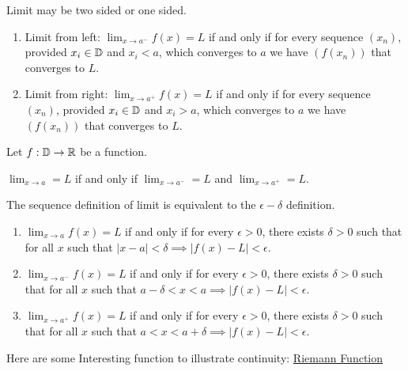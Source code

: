 \documentclass[../note.tex]{subfiles}
\begin{document}
\begin{definition}
	Limit may be two sided or one sided.
	\begin{enumerate}
	\item Limit from left: $\lim_{x \rightarrow a^-} f(x)=L$ if and only if for every sequence $(x_n)$, provided $x_i \in \mathbb{D}$ and $x_i<a$, which converges to $a$ we have $(f(x_n))$ that converges to $L$.
	\item Limit from right: $\lim_{x \rightarrow a^+} f(x)=L$ if and only if for every sequence $(x_n)$, provided $x_i \in \mathbb{D}$ and $x_i>a$, which converges to $a$ we have $(f(x_n))$ that converges to $L$.
	\end{enumerate}
\end{definition}

\begin{definition} 
\end{definition}

\begin{theorem}
	Let $f: \mathbb{D} \rightarrow \mathbb{R}$ be a function. 

	$\lim_{x \rightarrow a}=L$ if and only if $\lim_{x \rightarrow a^-}=L$ and $\lim_{x \rightarrow a^+}=L$.
\end{theorem}

\begin{theorem}
	The sequence definition of limit is equivalent to the $\epsilon-\delta$ definition.
	\begin{enumerate}
	\item $\lim_{x \rightarrow a} f(x)=L$ if and only if for every $\epsilon > 0$, there exists $\delta > 0$ such that for all $x$ such that $|x-a|<\delta \implies |f(x)-L|<\epsilon$.
	\item $\lim_{x \rightarrow a^-} f(x)=L$ if and only if for every $\epsilon > 0$, there exists $\delta > 0$ such that for all $x$ such that $a-\delta<x<a \implies |f(x)-L|<\epsilon$.
	\item $\lim_{x \rightarrow a^+} f(x)=L$ if and only if for every $\epsilon > 0$, there exists $\delta > 0$ such that for all $x$ such that $a<x<a+\delta \implies |f(x)-L|<\epsilon$.
	\end{enumerate}
\end{theorem}

Here are some Interesting function to illustrate continuity: \hyperlink{RiemannFunction}{Riemann Function}
\end{document}
